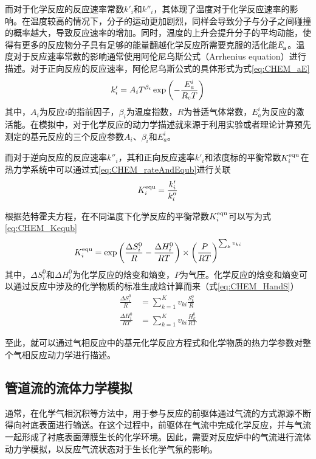 而对于化学反应的反应速率常数$k'_i$和$k''_i$，其体现了温度对于化学反应速率的影响。在温度较高的情况下，分子的运动更加剧烈，同样会导致分子与分子之间碰撞的概率越大，导致反应速率的增加。同时，温度的上升会提升分子的平均动能，使得有更多的反应物分子具有足够的能量翻越化学反应所需要克服的活化能$\it E_{\rm a}^{\rm } \it$。温度对于反应速率常数的影响通常使用阿伦尼乌斯公式（Arrhenius equation）进行描述。对于正向反应的反应速率，阿伦尼乌斯公式的具体形式为式\eqref{eq:CHEM_aE}\chinesecolon
\begin{equation}
    \label{eq:CHEM_aE}
    k'_i=A_iT^{\beta_i}\exp\left(-\frac{E_a^i}{R_{\rm c}T}\right)
\end{equation}
其中，$A_i$为反应$i$的指前因子，$\beta_i$为温度指数，$R$为普适气体常数，$E_a^i$为反应的激活能。在模拟中，对于化学反应的动力学描述就来源于利用实验或者理论计算预先测定的基元反应的三个反应参数$A_i$、$\beta_i$和$E_a^i$。

而对于逆向反应的反应速率$k''_i$，其和正向反应速率$k'_i$和浓度标的平衡常数$K_i^{\rm equ}$在热力学系统中可以通过式\eqref{eq:CHEM_rateAndEqub}进行关联\chinesecolon
\begin{equation}
    \label{eq:CHEM_rateAndEqub}
    K_i^{\rm equ}=\frac{k'_i}{k''_i}
\end{equation}

根据范特霍夫方程，在不同温度下化学反应的平衡常数$K_i^{\rm equ}$可以写为式\eqref{eq:CHEM_Kequb}\chinesecolon
\begin{equation}
    \label{eq:CHEM_Kequb}
    K_i^{\rm equ}=\exp\left(\frac{\Delta S_i^0}{R}-\frac{\Delta H_i^0}{RT}\right)\times\left(\frac{P}{RT}\right)^{\sum_k v_{ki}}
\end{equation}
其中，$\Delta S_i^0$和$\Delta H_i^0$为化学反应的焓变和熵变，$P$为气压。化学反应的焓变和熵变可以通过反应中涉及的化学物质的标准生成焓计算而来（式\eqref{eq:CHEM_HandS}）\chinesecolon
\begin{equation}
    \label{eq:CHEM_HandS}
    \begin{split}
        \frac{\Delta S_i^0}{R}&=\sum_{k=1}^K v_{ki}\frac{S_k^0}{R}\\
        \frac{\Delta H_i^0}{RT}&=\sum_{k=1}^K v_{ki}\frac{H_k^0}{RT}
    \end{split}
\end{equation}

至此，就可以通过气相反应中的基元化学反应方程式和化学物质的热力学参数对整个气相反应动力学进行描述。

\subsection{管道流的流体力学模拟}
通常，在化学气相沉积等方法中，用于参与反应的前驱体通过气流的方式源源不断得向衬底表面进行输送。在这个过程中，前驱体在气流中完成化学反应，并与气流一起形成了衬底表面薄膜生长的化学环境。因此，需要对反应炉中的气流进行流体动力学模拟，以反应气流状态对于生长化学气氛的影响。

